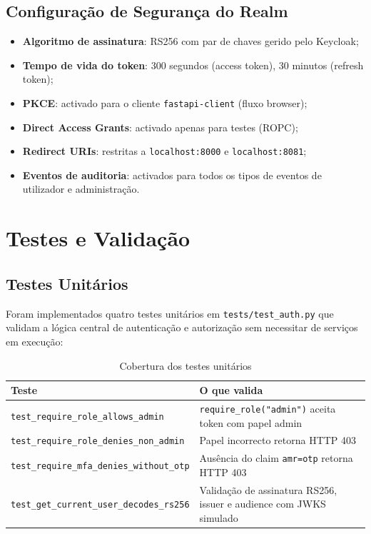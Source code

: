 \documentclass[12pt,a4paper]{article}
\begin{document}
\subsection{Configuração de Segurança do Realm}

\begin{itemize}[leftmargin=1.5cm]
  \item \textbf{Algoritmo de assinatura}: RS256 com par de chaves gerido pelo Keycloak;
  \item \textbf{Tempo de vida do token}: 300 segundos (access token), 30 minutos (refresh token);
  \item \textbf{PKCE}: activado para o cliente \texttt{fastapi-client} (fluxo browser);
  \item \textbf{Direct Access Grants}: activado apenas para testes (ROPC);
  \item \textbf{Redirect URIs}: restritas a \texttt{localhost:8000} e \texttt{localhost:8081};
  \item \textbf{Eventos de auditoria}: activados para todos os tipos de eventos de utilizador e administração.
\end{itemize}

\section{Testes e Validação}

\subsection{Testes Unitários}

Foram implementados quatro testes unitários em \texttt{tests/test\_auth.py} que validam a lógica central de autenticação e autorização sem necessitar de serviços em execução:

\begin{table}[H]
  \centering
  \caption{Cobertura dos testes unitários}
  \begin{tabularx}{\textwidth}{@{}lX@{}}
    \toprule
    \textbf{Teste} & \textbf{O que valida} \\
    \midrule
    \texttt{test\_require\_role\_allows\_admin} & \texttt{require\_role("admin")} aceita token com papel admin \\
    \texttt{test\_require\_role\_denies\_non\_admin} & Papel incorrecto retorna HTTP 403 \\
    \texttt{test\_require\_mfa\_denies\_without\_otp} & Ausência do claim \texttt{amr=otp} retorna HTTP 403 \\
    \texttt{test\_get\_current\_user\_decodes\_rs256} & Validação de assinatura RS256, issuer e audience com JWKS simulado \\
    \bottomrule
  \end{tabularx}
\end{table}
\end{document}
